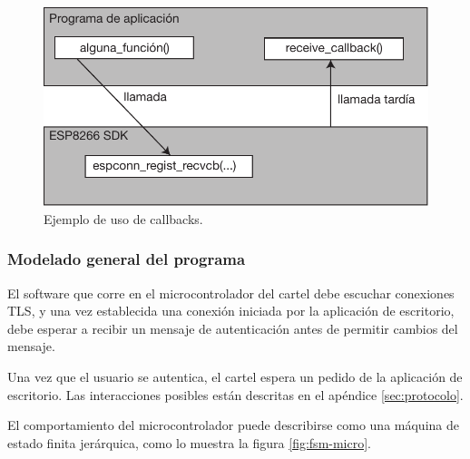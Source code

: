 \begin{figure}[ht!]
	\begin{center}
		\centering
		\includegraphics[scale=0.8]{imagenes/callbacks.pdf}
		\caption{Ejemplo de uso de callbacks.}
		\label{fig:callbacks}
	\end{center}
\end{figure}



\subsubsection{Modelado  general del programa}

El software que corre en el microcontrolador del cartel debe escuchar conexiones TLS, y una vez establecida una conexión iniciada por la aplicación de escritorio, debe esperar a recibir un mensaje de autenticación antes de permitir cambios del mensaje.

Una vez que el usuario se autentica, el cartel espera un pedido de la aplicación de escritorio. Las interacciones posibles están descritas en el apéndice \ref{sec:protocolo}.

El comportamiento del microcontrolador puede describirse como una máquina de estado finita jerárquica, como lo muestra la figura \ref{fig:fsm-micro}.

